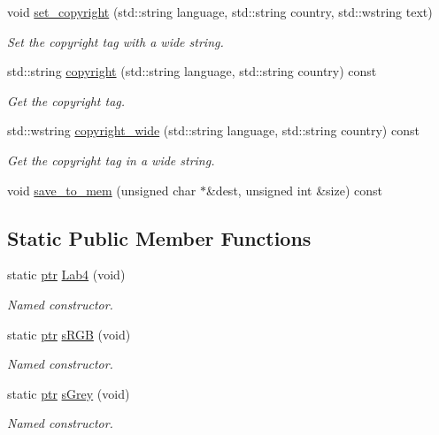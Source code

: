 \begin{DoxyCompactItemize}
void \hyperlink{class_c_m_s_1_1_profile_ad88fcfb7bd3adae8f8c9d4c9143f355f}{set\+\_\+copyright} (std\+::string language, std\+::string country, std\+::wstring text)
\begin{DoxyCompactList}\small\item\em Set the copyright tag with a wide string. \end{DoxyCompactList}\item 
std\+::string \hyperlink{class_c_m_s_1_1_profile_aa0820c0bb156499d5597a7cf54a3ecc0}{copyright} (std\+::string language, std\+::string country) const
\begin{DoxyCompactList}\small\item\em Get the copyright tag. \end{DoxyCompactList}\item 
std\+::wstring \hyperlink{class_c_m_s_1_1_profile_a8ce6488b146cbffb1f14171c1b862a8b}{copyright\+\_\+wide} (std\+::string language, std\+::string country) const
\begin{DoxyCompactList}\small\item\em Get the copyright tag in a wide string. \end{DoxyCompactList}\item 
void \hyperlink{class_c_m_s_1_1_profile_a223cfa717a36986157102cdcf32e2adf}{save\+\_\+to\+\_\+mem} (unsigned char $\ast$\&dest, unsigned int \&size) const
\end{DoxyCompactItemize}
\subsection*{Static Public Member Functions}
\begin{DoxyCompactItemize}
\item 
static \hyperlink{class_c_m_s_1_1_profile_a7d5a80e1317d17dbfdf5ae69820ab08b}{ptr} \hyperlink{class_c_m_s_1_1_profile_a8623f68331080ea5e1aef2f595e9ae00}{Lab4} (void)
\begin{DoxyCompactList}\small\item\em Named constructor. \end{DoxyCompactList}\item 
static \hyperlink{class_c_m_s_1_1_profile_a7d5a80e1317d17dbfdf5ae69820ab08b}{ptr} \hyperlink{class_c_m_s_1_1_profile_a7ca6f825e5e356f8553019b36079f93e}{s\+R\+GB} (void)
\begin{DoxyCompactList}\small\item\em Named constructor. \end{DoxyCompactList}\item 
static \hyperlink{class_c_m_s_1_1_profile_a7d5a80e1317d17dbfdf5ae69820ab08b}{ptr} \hyperlink{class_c_m_s_1_1_profile_a51111f314db7bfda93f5388f9eee551c}{s\+Grey} (void)
\begin{DoxyCompactList}\small\item\em Named constructor. \end{DoxyCompactList}\end{DoxyCompactItemize}
